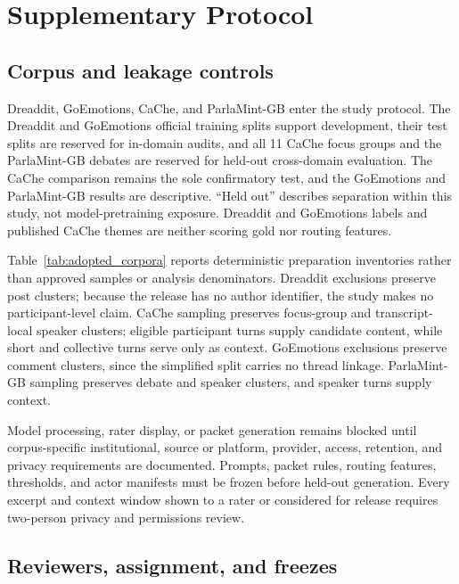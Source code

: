 \section{Supplementary Protocol}

\subsection{Corpus and leakage controls}
\label{sec:corpora_controls}

Dreaddit, GoEmotions, CaChe, and ParlaMint-GB enter the study protocol. The Dreaddit and GoEmotions official training splits support development, their test splits are reserved for in-domain audits, and all 11 CaChe focus groups and the ParlaMint-GB debates are reserved for held-out cross-domain evaluation. The CaChe comparison remains the sole confirmatory test, and the GoEmotions and ParlaMint-GB results are descriptive. ``Held out'' describes separation within this study, not model-pretraining exposure. Dreaddit and GoEmotions labels and published CaChe themes are neither scoring gold nor routing features.

Table~\ref{tab:adopted_corpora} reports deterministic preparation inventories rather than approved samples or analysis denominators. Dreaddit exclusions preserve post clusters; because the release has no author identifier, the study makes no participant-level claim. CaChe sampling preserves focus-group and transcript-local speaker clusters; eligible participant turns supply candidate content, while short and collective turns serve only as context. GoEmotions exclusions preserve comment clusters, since the simplified split carries no thread linkage. ParlaMint-GB sampling preserves debate and speaker clusters, and speaker turns supply context.

Model processing, rater display, or packet generation remains blocked until corpus-specific institutional, source or platform, provider, access, retention, and privacy requirements are documented. Prompts, packet rules, routing features, thresholds, and actor manifests must be frozen before held-out generation. Every excerpt and context window shown to a rater or considered for release requires two-person privacy and permissions review.

\subsection{Reviewers, assignment, and freezes}
\label{sec:reviewer_protocol}

